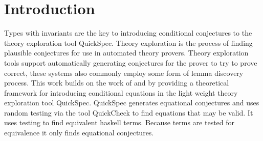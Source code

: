\section{Introduction}
Types with invariants are the key to
introducing conditional conjectures to
the theory exploration tool QuickSpec.
Theory exploration is the process of
finding plausible conjectures for use in
automated theory provers\cite{Johansson2014}. 
Theory exploration tools support automatically generating
conjectures for the prover to try to prove correct,
these systems also commonly employ some form of lemma discovery process\cite{heras2013}.
This work builds on the work of \cite{Johansson2014} and \cite{Claessen2010}
by providing a theoretical framework for introducing conditional
equations in the light weight theory exploration tool QuickSpec\cite{Claessen2010}.
QuickSpec generates equational conjectures and uses random testing via the tool QuickCheck\cite{Claessen2000}
to find equations that may be valid. It uses testing
to find equivalent haskell terms. Because terms are
tested for equivalence it only finds equational conjectures.

